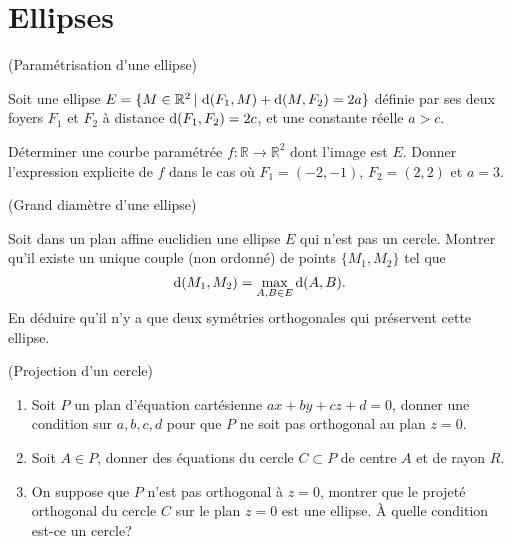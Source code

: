 \documentclass[a4paper,12pt,reqno]{amsart}
\begin{document}

\section{Ellipses}

\begin{exo} (Paramétrisation d'une ellipse)


  Soit une ellipse $E = \{ M \in \mathbb{R}^{2} \,|\, \operatorname{d}(F_{1},M)+\operatorname{d}(M,F_{2})=2a\}$ définie par ses deux foyers $F_{1}$ et $F_{2}$ à distance $\operatorname{d}(F_{1},F_{2})=2c$, et une constante réelle $a > c$.

  Déterminer une courbe paramétrée $f:\mathbb{R}\to\mathbb{R}^{2}$ dont l'image est $E$. Donner l'expression explicite de $f$ dans le cas où $F_{1}=(-2,-1)$, $F_{2}=(2,2)$ et $a=3$.
\end{exo}

\begin{exo} (Grand diamètre d'une ellipse)

  Soit dans un plan affine euclidien une ellipse $E$ qui n'est pas un cercle. Montrer qu'il existe un unique couple (non ordonné) de points $\{M_{1},M_{2}\}$ tel que
  \[
    \operatorname{d}(M_{1},M_{2})=\max_{A,B \in E}\operatorname{d}(A,B).
  \]
  En déduire qu'il n'y a que deux symétries orthogonales qui préservent cette ellipse.
\end{exo}


\begin{exo} (Projection d'un cercle)

  \begin{enumerate}
    \item  Soit $P$ un plan d'équation cartésienne $ax+by+cz+d=0$, donner une condition sur $a,b,c,d$ pour que $P$ ne soit pas orthogonal au plan $z=0$.
    \item Soit $A\in P$, donner des équations du cercle $C\subset P$ de centre $A$ et de rayon $R$.
    \item On suppose que $P$ n'est pas orthogonal à $z=0$, montrer que le projeté orthogonal du cercle $C$ sur le plan $z=0$ est une ellipse.  À quelle condition est-ce un cercle?
  \end{enumerate}

\end{exo}
\end{document}

